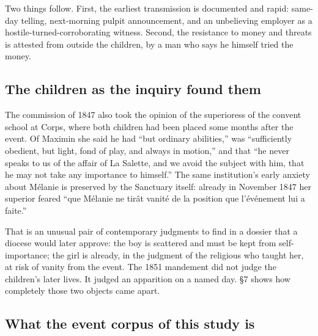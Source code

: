 Two things follow. First, the earliest transmission is documented
and rapid: same-day telling, next-morning pulpit announcement, and
an unbelieving employer as a hostile-turned-corroborating witness.
Second, the resistance to money and threats is attested from outside
the children, by a man who says he himself tried the money.

\subsection{The children as the inquiry found them}

The commission of 1847 also took the opinion of the superioress of
the convent school at Corps, where both children had been placed
some months after the event. Of Maximin she said he had ``but
ordinary abilities,'' was ``sufficiently obedient, but light, fond of
play, and always in motion,'' and that ``he never speaks to us of
the affair of La Salette, and we avoid the subject with him, that he
may not take any importance to himself.'' The same institution's
early anxiety about Mélanie is preserved by the Sanctuary itself:
already in November 1847 her superior feared ``que Mélanie ne tirât
vanité de la position que l'événement lui a
faite.''

That is an unusual pair of contemporary judgments to find in a
dossier that a diocese would later approve: the boy is scattered and
must be kept from self-importance; the girl is already, in the
judgment of the religious who taught her, at risk of vanity from
the event. The 1851 mandement did not judge the children's later
lives. It judged an apparition on a named day. \S7 shows how
completely those two objects came apart.

\subsection{What the event corpus of this study is}


